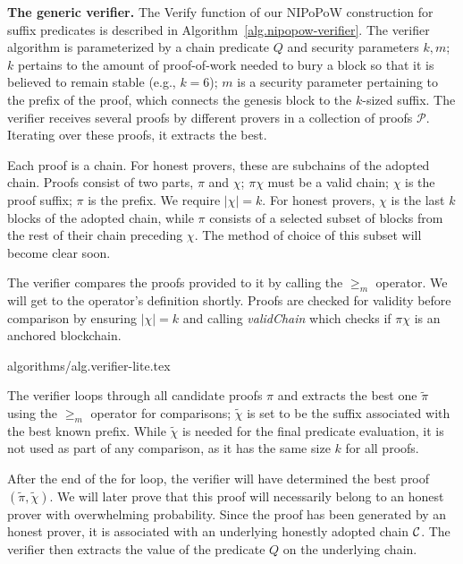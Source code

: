 \noindent
\textbf{The generic verifier.}
The \textsf{Verify} function of our NIPoPoW construction  for suffix predicates 
is described in
Algorithm~\ref{alg.nipopow-verifier}. The verifier algorithm is parameterized by
a chain predicate $Q$ and security parameters $k, m$; $k$
pertains to the amount of proof-of-work needed to bury a block so that it is
believed to remain stable (e.g., $k = 6$); $m$ is a security
parameter pertaining to the prefix of the proof, which connects the genesis
block to the $k$-sized suffix. The verifier receives several proofs by
different provers in a collection of proofs $\mathcal{P}$. Iterating over these
proofs, it extracts the best.

Each proof is a chain. For honest provers, these are subchains of the  adopted
chain. Proofs consist of two parts, $\pi$ and $\chi$; $\pi \chi$ must be a valid
chain; $\chi$ is the proof suffix; $\pi$ is the prefix. We require $|\chi| = k$.
For honest provers, $\chi$ is the last $k$ blocks of the adopted chain, while
$\pi$ consists of a selected subset of blocks from the rest of their chain
preceding $\chi$. The method of choice of this subset will become clear soon.

The verifier compares the proofs provided to it by calling the $\geq_m$
operator. We will get to the operator's definition
shortly. Proofs are checked for validity before comparison by ensuring $|\chi| =
k$ and calling \textit{validChain} which checks if $\pi\chi$ is an anchored
blockchain.

{algorithms/alg.verifier-lite.tex}

The verifier loops through all candidate proofs $\pi$ and extracts the best one
$\tilde\pi$ using the $\geq_m$ operator for comparisons; $\tilde\chi$ is set to
be the suffix associated with the best known prefix. While $\tilde\chi$ is
needed for the final predicate evaluation, it is not used as part of any
comparison, as it has the same size $k$ for all proofs.

After the end of the for loop, the verifier will have determined the best proof
$(\tilde\pi, \tilde\chi)$. We will later prove that this proof will necessarily
belong to an honest prover with overwhelming probability. Since the proof has
been generated by an honest prover, it is associated with an underlying honestly
adopted chain $\mathcal{C}$. The verifier then extracts the value of the predicate
$Q$ on the underlying chain.


